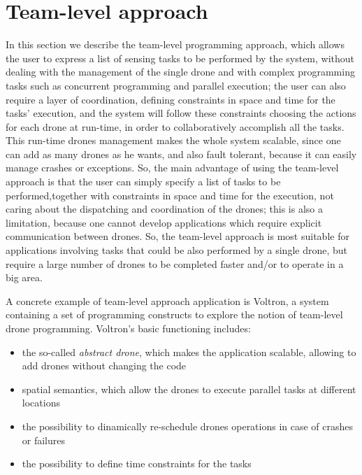\section {Team-level approach}\label{teamlevel}

In this section we describe the team-level programming approach\cite{voltron}, which allows the user to express a list of sensing tasks to be performed by the system, without dealing with the management of the single drone and with complex programming tasks such as concurrent programming and parallel execution; the user can also require a layer of coordination, defining constraints in space and time for the tasks' execution, and the system will follow these constraints choosing the actions for each drone at run-time, in order to collaboratively accomplish all the tasks.
This run-time drones management makes the whole system scalable, since one can add as many drones as he wants, and also fault tolerant, because it can easily manage crashes or exceptions.
So, the main advantage of using the team-level approach is that the user can simply specify a list of tasks to be performed,together with constraints in space and time for the execution, not caring about the dispatching and coordination of the drones; this is also a limitation, because one cannot develop applications which require explicit communication between drones.
So, the team-level approach is most suitable for applications involving tasks that could be also performed by a single drone, but require a large number of drones to be completed faster and/or to operate in a big area.


A concrete example of team-level approach application is Voltron\cite{voltron}, a system containing a set of programming constructs to explore the notion of team-level drone programming. 
Voltron's\cite{voltron} basic functioning includes:

\begin{itemize}
\itemsep2pt
\item{
the so-called \textit{abstract drone}, which makes the application scalable, allowing to add drones without changing the code
}
\item{spatial semantics, which allow the drones to execute parallel tasks at different locations
}
\item{
the possibility to dinamically re-schedule drones operations in case of crashes or failures
}
\item{
the possibility to define time constraints for the tasks 
}
\end{itemize}

